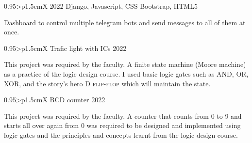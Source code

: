 \documentclass[a4paper, oneside, final]{scrartcl} %
\begin{document}
\begin{center}

\begin{paracol}{2}


\begin{tabularx}{0.95\linewidth}{>{\raggedleft\scshape}p{1.5cm}X}
 {}
 {2022}
 {Django, Javascript, CSS Bootstrap, HTML5}
\end{tabularx}

\vspace{2mm}
\parbox{0.95\linewidth}{%
Dashboard to control multiple telegram bots and send messages to all of them at once.
}%

\vspace{20pt}

\begin{tabularx}{0.95\linewidth}{>{\raggedleft\scshape}p{1.5cm}X}
 {Trafic light with ICs}
 {2022}
\end{tabularx}

\vspace{2mm}
\parbox{0.95\linewidth}{%
This project was required by the faculty. A finite state machine (Moore machine) as a practice of the logic design course. I used basic logic gates such as \textsc{AND}, \textsc{OR}, \textsc{XOR}, and the story's hero \textsc{D flip-flop} which will maintain the state.
}%

\vspace{20pt}

\begin{tabularx}{0.95\linewidth}{>{\raggedleft\scshape}p{1.5cm}X}
 {BCD counter}
 {2022}
\end{tabularx}

\vspace{2mm}
\parbox{0.95\linewidth}{%
This project was required by the faculty. A counter that counts from 0 to 9 and starts all over again from 0 was required to be designed and implemented using logic gates and the principles and concepts learnt from the logic design course.
}%

\vspace{20pt}


\end{paracol}
\end{center}
\end{document}
